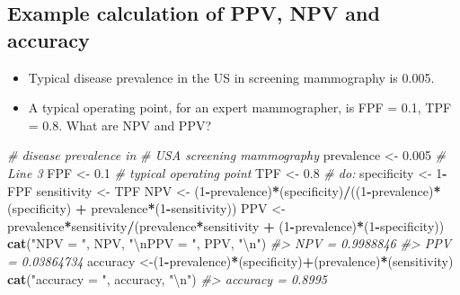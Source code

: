 \documentclass[
]{book}
\newenvironment{Shaded}{\begin{snugshade}}{\end{snugshade}}
\newcommand{\CharTok}[1]{\textcolor[rgb]{0.31,0.60,0.02}{#1}}
\newcommand{\CommentTok}[1]{\textcolor[rgb]{0.56,0.35,0.01}{\textit{#1}}}
\newcommand{\DecValTok}[1]{\textcolor[rgb]{0.00,0.00,0.81}{#1}}
\newcommand{\FloatTok}[1]{\textcolor[rgb]{0.00,0.00,0.81}{#1}}
\newcommand{\KeywordTok}[1]{\textcolor[rgb]{0.13,0.29,0.53}{\textbf{#1}}}
\newcommand{\NormalTok}[1]{#1}
\newcommand{\OperatorTok}[1]{\textcolor[rgb]{0.81,0.36,0.00}{\textbf{#1}}}
\newcommand{\StringTok}[1]{\textcolor[rgb]{0.31,0.60,0.02}{#1}}
\providecommand{\tightlist}{%
  \setlength{\itemsep}{0pt}\setlength{\parskip}{0pt}}
\begin{document}
\hypertarget{binary-taskNpvPpvCode}{%
\subsection{Example calculation of PPV, NPV and accuracy}\label{binary-taskNpvPpvCode}}

\begin{itemize}
\tightlist
\item
  Typical disease prevalence in the US in screening mammography is 0.005.
\item
  A typical operating point, for an expert mammographer, is FPF = 0.1, TPF = 0.8. What are NPV and PPV?
\end{itemize}

\begin{Shaded}
\begin{Highlighting}[]
\CommentTok{# disease prevalence in }
\CommentTok{# USA screening mammography }
\NormalTok{prevalence <-}\StringTok{ }\FloatTok{0.005} \CommentTok{# Line 3 }
\NormalTok{FPF <-}\StringTok{ }\FloatTok{0.1} \CommentTok{# typical operating point }
\NormalTok{TPF <-}\StringTok{ }\FloatTok{0.8} \CommentTok{#        do: }
\NormalTok{specificity <-}\StringTok{ }\DecValTok{1}\OperatorTok{-}\NormalTok{FPF }
\NormalTok{sensitivity <-}\StringTok{ }\NormalTok{TPF }
\NormalTok{NPV <-}\StringTok{ }\NormalTok{(}\DecValTok{1}\OperatorTok{-}\NormalTok{prevalence)}\OperatorTok{*}\NormalTok{(specificity)}\OperatorTok{/}\NormalTok{((}\DecValTok{1}\OperatorTok{-}\NormalTok{prevalence)}\OperatorTok{*}\NormalTok{(specificity) }\OperatorTok{+}\StringTok{ }\NormalTok{prevalence}\OperatorTok{*}\NormalTok{(}\DecValTok{1}\OperatorTok{-}\NormalTok{sensitivity)) }
\NormalTok{PPV <-}\StringTok{ }\NormalTok{prevalence}\OperatorTok{*}\NormalTok{sensitivity}\OperatorTok{/}\NormalTok{(prevalence}\OperatorTok{*}\NormalTok{sensitivity }\OperatorTok{+}\StringTok{ }\NormalTok{(}\DecValTok{1}\OperatorTok{-}\NormalTok{prevalence)}\OperatorTok{*}\NormalTok{(}\DecValTok{1}\OperatorTok{-}\NormalTok{specificity)) }
\KeywordTok{cat}\NormalTok{(}\StringTok{"NPV = "}\NormalTok{, NPV, }\StringTok{"}\CharTok{\textbackslash{}n}\StringTok{PPV = "}\NormalTok{, PPV, }\StringTok{"}\CharTok{\textbackslash{}n}\StringTok{"}\NormalTok{)}
\CommentTok{#> NPV =  0.9988846 }
\CommentTok{#> PPV =  0.03864734}
\NormalTok{accuracy <-(}\DecValTok{1}\OperatorTok{-}\NormalTok{prevalence)}\OperatorTok{*}\NormalTok{(specificity)}\OperatorTok{+}\NormalTok{(prevalence)}\OperatorTok{*}\NormalTok{(sensitivity) }
\KeywordTok{cat}\NormalTok{(}\StringTok{"accuracy = "}\NormalTok{, accuracy, }\StringTok{"}\CharTok{\textbackslash{}n}\StringTok{"}\NormalTok{)}
\CommentTok{#> accuracy =  0.8995}
\end{Highlighting}
\end{Shaded}
\end{document}
